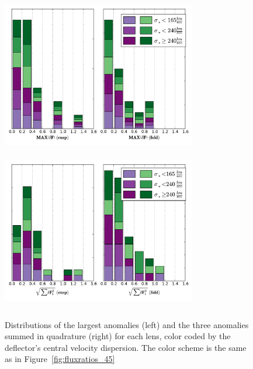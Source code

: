 \begin{figure}
	{\includegraphics[trim=0cm 0.2cm 0cm 0.3cm,clip,width=8.5cm, height=6.85cm]{./figures_sls/maxanomaly_dis-eps-converted-to.pdf}}
	{\includegraphics[trim=0cm 0.2cm 0cm 0.3cm,clip,width=8.5cm, height=7cm]{./figures_sls/sumquad_dis-eps-converted-to.pdf}}
	\caption[Distributions of largest flux ratio anomalies for the smooth model fits]{\label{fig:distributions_45}Distributions of the largest anomalies (left) and the three anomalies summed in quadrature (right) for each lens, color coded by the deflector's central velocity dispersion. The color scheme is the same as in Figure~\ref{fig:fluxratios_45}}
\end{figure}

